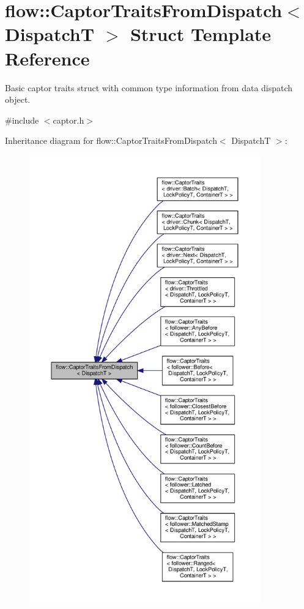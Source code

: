 \hypertarget{structflow_1_1_captor_traits_from_dispatch}{}\section{flow\+:\+:Captor\+Traits\+From\+Dispatch$<$ DispatchT $>$ Struct Template Reference}
\label{structflow_1_1_captor_traits_from_dispatch}


Basic captor traits struct with common type information from data dispatch object.  




{\ttfamily \#include $<$captor.\+h$>$}



Inheritance diagram for flow\+:\+:Captor\+Traits\+From\+Dispatch$<$ DispatchT $>$\+:\nopagebreak
\begin{figure}[H]
\begin{center}
\leavevmode
\includegraphics[height=550pt]{structflow_1_1_captor_traits_from_dispatch__inherit__graph}
\end{center}
\end{figure}
